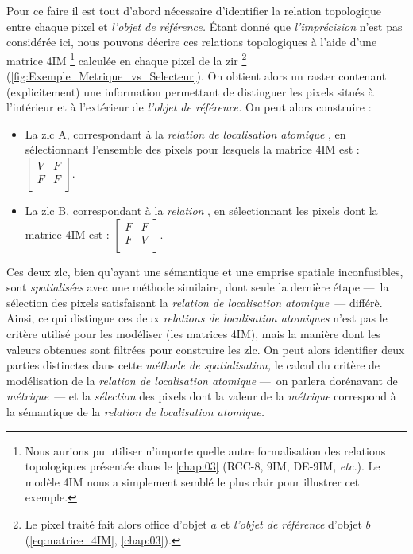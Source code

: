 Pour ce faire il est tout d'abord nécessaire d'identifier la relation topologique entre chaque pixel et \emph{l'objet de référence.} Étant donné que \emph{l'imprécision} n'est pas considérée ici, nous pouvons décrire ces relations topologiques à l'aide d'une matrice 4IM \footnote{Nous aurions pu utiliser n'importe quelle autre formalisation des relations topologiques présentée dans le \autoref{chap:03} (RCC-8, 9IM, DE-9IM, \emph{etc.}). Le modèle 4IM nous a simplement semblé le plus clair pour illustrer cet exemple.} calculée en chaque pixel de la \ac{zir} \footnote{Le pixel traité fait alors office d'objet \(a\) et \emph{l'objet de référence} d'objet \(b\) (\autoref{eq:matrice_4IM}, \autoref{chap:03}).} (\autoref{fig:Exemple_Metrique_vs_Selecteur}). On obtient alors un raster contenant (explicitement) une information permettant de distinguer les pixels situés à l'intérieur et à l'extérieur de \emph{l'objet de référence.} On peut alors construire :
% 
\begin{itemize}
\item La \ac{zlc} \textcolor{RdBu-9-1}{\textsf{A}}, correspondant à la \emph{relation de localisation atomique} , en sélectionnant l'ensemble des pixels pour lesquels la matrice 4IM est : \(\left[\begin{smallmatrix}V&F\\F&F\\\end{smallmatrix}\right]\).
\item La \ac{zlc} \textcolor{RdBu-9-9}{\textsf{B}}, correspondant à la \emph{relation} , en sélectionnant les pixels dont la matrice 4IM est : \(\left[\begin{smallmatrix}F&F\\F&V\\\end{smallmatrix}\right]\).
\end{itemize}
%
Ces deux \ac{zlc}, bien qu'ayant une sémantique et une emprise spatiale inconfusibles, sont \emph{spatialisées} avec une méthode similaire, dont seule la dernière étape ---~la sélection des pixels satisfaisant la \emph{relation de localisation atomique}~--- différè.
Ainsi, ce qui distingue ces deux \emph{relations de localisation atomiques} n'est pas le critère utilisé pour les modéliser (\ie les matrices 4IM), mais la manière dont les valeurs obtenues sont filtrées pour construire les \ac{zlc}. On peut alors identifier deux parties distinctes dans cette \emph{méthode de spatialisation,} le calcul du critère de modélisation de la \emph{relation de localisation atomique} ---~on parlera dorénavant de \emph{métrique}~--- et la \emph{sélection} des pixels dont la valeur de la \emph{métrique} correspond à la sémantique de la \emph{relation de localisation atomique.}

